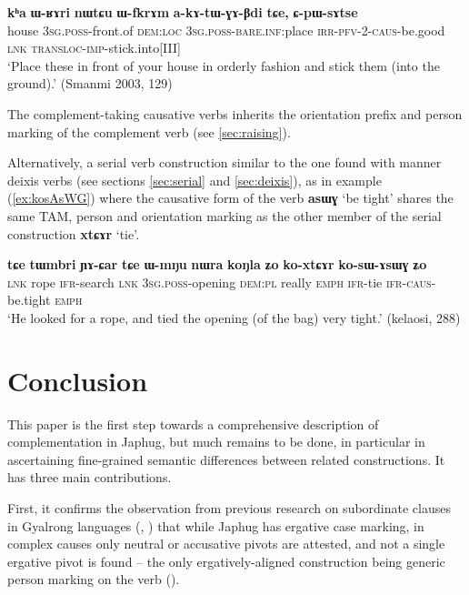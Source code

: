 \documentclass[oneside,a4paper,11pt]{article}
\newcommand{\ipa}[1]{\textbf{\phon#1}} %
\newcommand{\jpg}[2]{\ipa{#1} `#2'} %
\newcommand{\refb}[1]{(\ref{#1})}
\begin{document}
\begin{exe}
\ex \label{ex:akAtWGABdi}
\gll \ipa{kʰa} 	\ipa{ɯ-ʁɤri} 	\ipa{nɯtɕu} 	\ipa{ɯ-fkrɤm} 	\ipa{a-kɤ-tɯ-ɣɤ-βdi} 	\ipa{tɕe,} 	\ipa{ɕ-pɯ-sɤtse} \\
house \textsc{3sg.poss}-front.of \textsc{dem:loc} \textsc{3sg.poss-bare.inf}:place \textsc{irr-pfv-2-caus}-be.good \textsc{lnk} \textsc{transloc-imp}-stick.into[III] \\
\glt `Place these in front of your house in orderly fashion and stick them (into the ground).' (Smanmi 2003, 129)
\end{exe}

The complement-taking causative verbs inherits the orientation prefix and person marking of the complement verb (see \ref{sec:raising}). 


Alternatively, a serial verb construction similar to the one found with manner deixis verbs (see sections \ref{sec:serial} and \ref{sec:deixis}), as in example  \refb{ex:kosAsWG} where the causative form of the verb \jpg{asɯɣ}{be tight} shares the same TAM, person and orientation marking as the other member of the serial construction \jpg{xtɕɤr}{tie}.


\begin{exe}
\ex \label{ex:kosAsWG}
\gll 
\ipa{tɕe} 	\ipa{tɯmbri} 	\ipa{ɲɤ-ɕar} 	\ipa{tɕe} 	\ipa{ɯ-mŋu} 	\ipa{nɯra} 	\ipa{koŋla} 	\ipa{ʑo} 	\ipa{ko-xtɕɤr} 	\ipa{ko-sɯ-ɤsɯɣ} 	\ipa{ʑo} \\
\textsc{lnk} rope \textsc{ifr}-search \textsc{lnk} \textsc{3sg.poss}-opening \textsc{dem:pl} really \textsc{emph} \textsc{ifr}-tie \textsc{ifr-caus}-be.tight \textsc{emph} \\
\glt `He looked for a rope, and tied the opening (of the bag) very tight.' (kelaosi, 288)
\end{exe}
 
  
 \section{Conclusion}
This paper is the first step towards a comprehensive description of complementation in Japhug, but much remains to be done, in particular in ascertaining fine-grained semantic differences between related constructions. It has three main contributions.

First, it confirms the observation from previous research on subordinate clauses in Gyalrong languages (\citealt{jacques16relatives}, \citealt{jackson03caodeng}) that while Japhug has ergative case marking, in complex causes only neutral or accusative pivots are attested, and not a single ergative pivot is found -- the only ergatively-aligned construction being  generic person marking on the verb (\citealt{jacques12demotion}).
\end{document}

